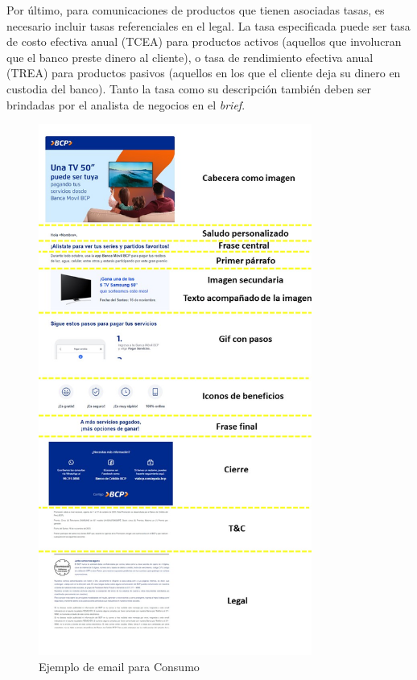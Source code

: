 Por último, para comunicaciones de productos que tienen asociadas tasas, es necesario incluir tasas referenciales en el legal. La tasa especificada puede ser tasa de costo efectiva anual (TCEA) para productos activos (aquellos que involucran que el banco preste dinero al cliente), o tasa de rendimiento efectiva anual (TREA) para productos pasivos (aquellos en los que el cliente deja su dinero en custodia del banco). Tanto la tasa como su descripción también deben ser brindadas por el analista de negocios en el \textit{brief}.

\cleardoublepage
\begin{figure}[!htpb]
     \centering
     \includegraphics[width=0.8\textwidth]{./Figures/ejemplo_Consumo}
    \caption{Ejemplo de email para Consumo}
    \label{fig:EjConsumo}
\end{figure}

